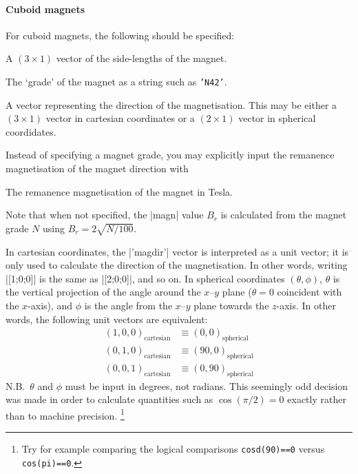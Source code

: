 \documentclass{article}
\begin{document}
\paragraph{Cuboid magnets}
For cuboid magnets, the following should be specified:
\begin{description}[noitemsep,font=\ttfamily]
\item['dim'] A $(3\times1)$ vector of the side-lengths of the magnet.
\item['grade'] The `grade' of the magnet as a string such as \texttt{'N42'}.
\item['magdir'] A vector representing the direction of the magnetisation.
                This may be either a $(3\times1)$ vector in cartesian
                coordinates or a $(2\times1)$ vector in spherical coordidates.
\end{description}
Instead of specifying a magnet grade, you may explicitly input the remanence magnetisation
of the magnet direction with
\begin{description}[noitemsep,font=\ttfamily]
\item['magn'] The remanence magnetisation of the magnet in Tesla.
\end{description}
Note that when not specified, the |magn| value $B_r$ is calculated from the magnet grade $N$ using $B_r=2\sqrt{N/100}$.

In cartesian coordinates, the |'magdir'| vector is interpreted as a unit vector; it is only used to calculate the direction of the magnetisation.
In other words, writing |[1;0;0]| is the same as |[2;0;0]|, and so on.
In spherical coordinates $(\theta,\phi)$, $\theta$ is the vertical projection of the angle around the $x$--$y$ plane ($\theta=0$ coincident with the $x$-axis), and $\phi$ is the angle from the $x$--$y$ plane towards the $z$-axis.
In other words, the following unit vectors are equivalent:
\begin{align*}
(1,0,0)_{\text{cartesian}} &\equiv (0,0)_{\text{spherical}}\\
(0,1,0)_{\text{cartesian}} &\equiv (90,0)_{\text{spherical}}\\
(0,0,1)_{\text{cartesian}} &\equiv (0,90)_{\text{spherical}}
\end{align*}
N.B.\ $\theta$ and $\phi$ must be input in degrees, not radians.
This seemingly odd decision was made in order to calculate quantities such as $\cos(\pi/2)=0$ exactly rather than to machine precision.%
\footnote{Try for example comparing the logical comparisons \texttt{cosd(90)==0} versus \texttt{cos(pi)==0}.}
\end{document}
